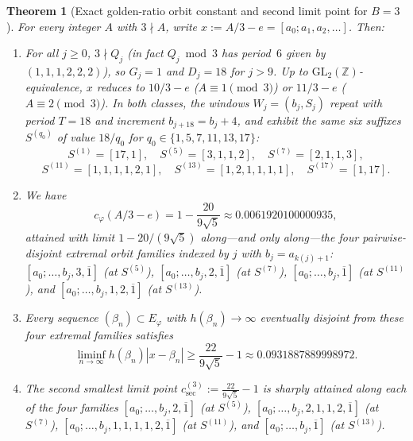 \documentclass[11pt]{amsart}
\newtheorem{theorem}{Theorem}[section]
\theoremstyle{definition}
\theoremstyle{remark}
\numberwithin{equation}{section}
\newcommand{\Z}{\mathbb{Z}}
\begin{document}
\begin{theorem}[Exact golden-ratio orbit constant and second limit point for $B=3$]\label{thm:golden-b3-exact}
For every integer $A$ with $3\nmid A$, write $x:=A/3-e=[a_0;a_1,a_2,\ldots]$. Then:
\begin{enumerate}
\item For all $j\ge0$, $3\nmid Q_j$ (in fact $Q_j\bmod3$ has period~$6$ given
      by $(1,1,1,2,2,2)$), so $G_j=1$ and $D_j=18$ for $j>9$. Up to
      $\mathrm{GL}_2(\Z)$-equivalence, $x$ reduces to $10/3-e$ ($A\equiv1\pmod3$)
      or $11/3-e$ ($A\equiv2\pmod3$). In both classes, the windows
      $W_j=(b_j,S_j)$ repeat with period $T=18$ and increment
      $b_{j+18}=b_j+4$, and exhibit the same six suffixes $S^{(q_0)}$ of
      value $18/q_0$ for $q_0\in\{1,5,7,11,13,17\}$:
      \[
       S^{(1)}=[17,1],\quad S^{(5)}=[3,1,1,2],\quad S^{(7)}=[2,1,1,3],
      \]
      \[
       S^{(11)}=[1,1,1,1,2,1],\quad S^{(13)}=[1,2,1,1,1,1],\quad S^{(17)}=[1,17].
      \]
\item We have
      \[
       c_\varphi(A/3-e)=1-\frac{20}{9\sqrt5}\approx 0.0061920100000935,
      \]
      attained with limit $1-20/(9\sqrt5)$ along—and only along—the four
      pairwise-disjoint extremal orbit families indexed by $j$ with $b_j=a_{k(j)+1}$:
      $[a_0;\ldots,b_j,3,\overline1]$ (at $S^{(5)}$),
      $[a_0;\ldots,b_j,2,\overline1]$ (at $S^{(7)}$),
      $[a_0;\ldots,b_j,\overline1]$ (at $S^{(11)}$), and
      $[a_0;\ldots,b_j,1,2,\overline1]$ (at $S^{(13)}$).
\item Every sequence $(\beta_n)\subset E_\varphi$ with $h(\beta_n)\to\infty$
      eventually disjoint from these four extremal families satisfies
      \[
       \liminf_{n\to\infty} h(\beta_n)|x-\beta_n|\ge\frac{22}{9\sqrt5}-1\approx 0.0931887889998972.
      \]
\item The second smallest limit point $c_{\mathrm{sec}}^{(3)}:=\frac{22}{9\sqrt5}-1$
      is sharply attained along each of the four families
      $[a_0;\ldots,b_j,2,\overline1]$ (at $S^{(5)}$),
      $[a_0;\ldots,b_j,2,1,1,2,\overline1]$ (at $S^{(7)}$),
      $[a_0;\ldots,b_j,1,1,1,1,2,\overline1]$ (at $S^{(11)}$), and
      $[a_0;\ldots,b_j,\overline1]$ (at $S^{(13)}$).
\end{enumerate}
\end{theorem}
\end{document}
